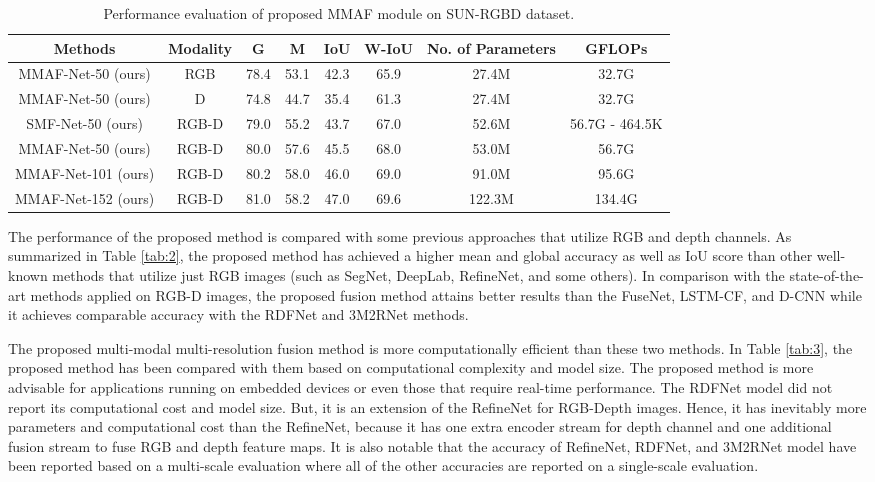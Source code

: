 \documentclass[journal,transmag]{IEEEtran}
\begin{document}
\begin{table*}
	\centering
	\caption{Performance evaluation of proposed MMAF module on SUN-RGBD dataset.}
	\label{tab:1}
	\begin{tabular}{|c|c|c|c|c|c|c|c|}
		\hline
		Methods	&Modality&	G &	M&	IoU&	W-IoU	& No. of Parameters & GFLOPs \\
		\hline
		MMAF-Net-50 (ours)& RGB &78.4& 53.1& 42.3 & 65.9& 27.4M&32.7G\\ 
		\hline
		MMAF-Net-50 (ours) &D&	74.8&	44.7&	35.4&61.3&27.4M&32.7G\\
		\hline
		SMF-Net-50 (ours) &RGB-D&	79.0&	55.2&	43.7&67.0&	52.6M&56.7G - 464.5K\\
		\hline
		MMAF-Net-50 (ours) & RGB-D & 80.0 & 57.6 & 45.5 & 68.0&53.0M & 56.7G\\
		\hline
		MMAF-Net-101 (ours)& 	RGB-D&	80.2&58.0&	46.0& 69.0& 91.0M& 95.6G\\
		\hline
		MMAF-Net-152 (ours) & 	RGB-D&81.0	&58.2	&47.0	& 	69.6&122.3M	&134.4G\\
		\hline			
	\end{tabular}
\end{table*}

The performance of the proposed method is compared with some previous approaches that utilize RGB and depth channels.  As summarized in Table \ref{tab:2}, the proposed method has achieved a higher mean and global accuracy as well as IoU score than  other well-known methods that utilize just RGB images (such as SegNet, DeepLab, RefineNet, and some others). In comparison with the state-of-the-art methods applied on RGB-D images, the proposed fusion method attains better results than the FuseNet, LSTM-CF, and D-CNN while it achieves comparable accuracy with the RDFNet and 3M2RNet methods.

The proposed multi-modal multi-resolution fusion method is more computationally efficient than these two methods. In Table \ref{tab:3}, the proposed method has been compared with them based on computational complexity and model size. The proposed method is more advisable for applications running on embedded devices or even those that require real-time performance. The RDFNet model did not report its computational cost and model size. But, it is an extension of the RefineNet for RGB-Depth images. Hence, it has inevitably more parameters and computational cost than the RefineNet, because it has one extra encoder stream for depth channel and one additional fusion stream to fuse RGB and depth feature maps. It is also notable that the accuracy of RefineNet, RDFNet, and 3M2RNet model have been reported based on a multi-scale evaluation  where all of the other accuracies are reported on a single-scale evaluation.
\end{document}
